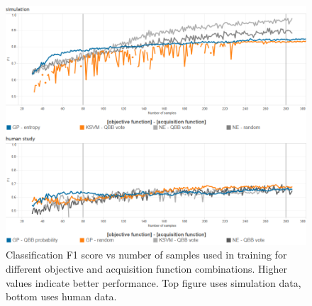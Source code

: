 \documentclass{sig-alternate}
\begin{document}
\begin{table}[tb]
\label{tab:cls_sim}
\end{table}

\begin{figure}[tbph]
\centering
\includegraphics[width=\linewidth]{classification_results}
\caption{Classification F1 score vs number of samples used in training for different objective and acquisition function combinations. Higher values indicate better performance. Top figure uses simulation data, bottom uses human data.}
\label{fig:cls_all}
\end{figure}
\end{document}
